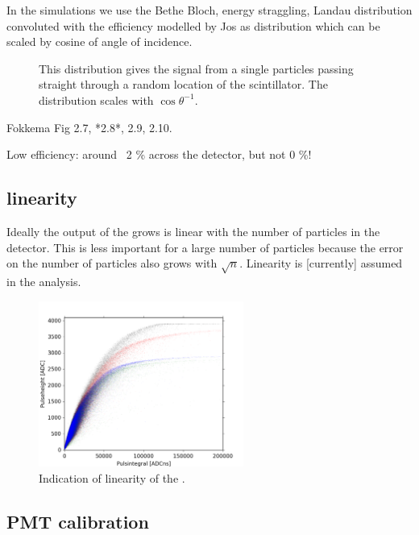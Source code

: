 In the simulations we use the Bethe Bloch, energy straggling, Landau
distribution convoluted with the efficiency modelled by Jos as
distribution which can be scaled by cosine of angle of incidence.

\begin{figure}
    \centering
    
    \caption{ This distribution gives
             the signal from a single particles passing straight through
             a random location of the scintillator. The distribution
             scales with $\cos{\theta}^{-1}$.}
    \label{fig:signal_efficiency}
\end{figure}

Fokkema Fig 2.7, *2.8*, 2.9, 2.10.

Low efficiency: around ~2 \% across the detector, but not 0 \%!



\subsection{\pmt linearity}

Ideally the output of the \pmt grows is linear with the number of
particles in the detector. This is less important for a large number of
particles because the error on the number of particles also grows with
$\sqrt{n}$. Linearity is [currently] assumed in the analysis.

\begin{figure}
    \centering
    \includegraphics[width=0.6\textwidth]{plots/response/ph_vs_pi.png}
    \caption{
             Indication of linearity of the \pmt.}
    \label{fig:pmt_ph_pi}
\end{figure}


\subsection{PMT calibration}
\label{sub:pmt_calibration}

